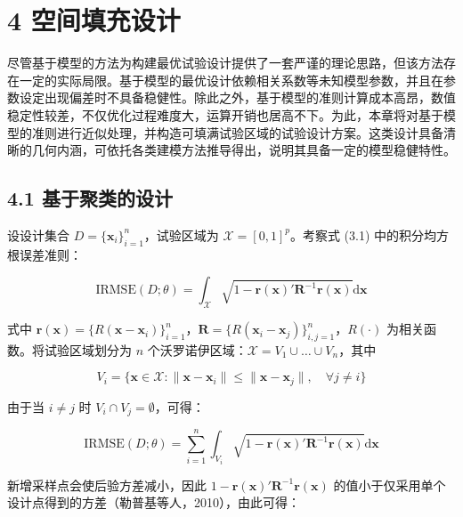 \documentclass{ctexart}
\begin{document}
\section*{4 空间填充设计}

尽管基于模型的方法为构建最优试验设计提供了一套严谨的理论思路，但该方法存在一定的实际局限。基于模型的最优设计依赖相关系数等未知模型参数，并且在参数设定出现偏差时不具备稳健性。除此之外，基于模型的准则计算成本高昂，数值稳定性较差，不仅优化过程难度大，运算开销也居高不下。为此，本章将对基于模型的准则进行近似处理，并构造可填满试验区域的试验设计方案。这类设计具备清晰的几何内涵，可依托各类建模方法推导得出，说明其具备一定的模型稳健特性。

\subsection*{4.1 基于聚类的设计}

设设计集合 $D=\{\boldsymbol{x}_i\}_{i=1}^n$，试验区域为 $\mathcal{X}=[0,1]^p$。考察式 (3.1) 中的积分均方根误差准则：

\begin{equation*}
\mathrm{IRMSE}(D;\theta)=\int_{\mathcal{X}}\sqrt{1-\boldsymbol{r}(\boldsymbol{x})'\boldsymbol{R}^{-1}\boldsymbol{r}(\boldsymbol{x})}\mathrm{d}\boldsymbol{x}
\end{equation*}

式中 $\boldsymbol{r}(\boldsymbol{x})=\{R(\boldsymbol{x}-\boldsymbol{x}_i)\}_{i=1}^n$，$\boldsymbol{R}=\{R(\boldsymbol{x}_i-\boldsymbol{x}_j)\}_{i,j=1}^n$，$R(\cdot)$ 为相关函数。将试验区域划分为 $n$ 个沃罗诺伊区域：$\mathcal{X}=V_1\cup\dots\cup V_n$，其中

\begin{equation*}
V_i=\{\boldsymbol{x}\in\mathcal{X}:\|\boldsymbol{x}-\boldsymbol{x}_i\|\le\|\boldsymbol{x}-\boldsymbol{x}_j\|,\quad\forall j\ne i\}
\tag{4.1}
\end{equation*}

由于当 $i\ne j$ 时 $V_i\cap V_j=\emptyset$，可得：

\begin{equation*}
\mathrm{IRMSE}(D;\theta)=\sum_{i=1}^n\int_{V_i}\sqrt{1-\boldsymbol{r}(\boldsymbol{x})'\boldsymbol{R}^{-1}\boldsymbol{r}(\boldsymbol{x})}\mathrm{d}\boldsymbol{x}
\end{equation*}

新增采样点会使后验方差减小，因此 $1-\boldsymbol{r}(\boldsymbol{x})'\boldsymbol{R}^{-1}\boldsymbol{r}(\boldsymbol{x})$ 的值小于仅采用单个设计点得到的方差（勒普基等人，2010），由此可得：
\end{document}
